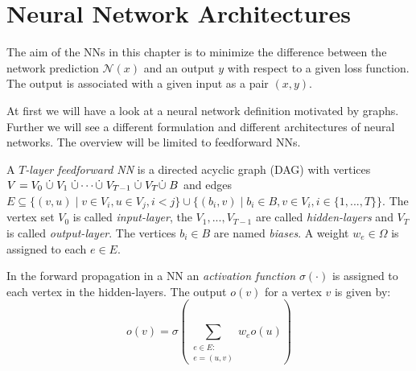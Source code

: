 \documentclass[a4paper, 12pt]{scrreprt} %
\begin{document}
\chapter{Neural Network Architectures}
\label{chap:NNA}
The aim of the \acfp{NN} in this chapter is to minimize the difference between the network prediction $\mathcal{N}(x)$ and an output $y$ with respect to a given loss function. The output is associated with a given input as a pair $(x,y)$. 

At first we will have a look at a neural network definition motivated by graphs. Further we will see a different formulation and different architectures of neural networks. The overview will be limited to feedforward \acp{NN}.

\begin{definition}
A \emph{$T$-layer feedforward \acl{NN}} is a directed acyclic graph (DAG) with vertices $V = V_0 \hspace{0.1cm}\dot \cup\hspace{0.1cm} V_1 \hspace{0.1cm}\dot \cup \cdots \dot \cup\hspace{0.1cm} V_{T-1} \hspace{0.1cm}\dot \cup \hspace{0.1cm}V_T \dot \cup\hspace{0.1cm} B$ and edges $E \subseteq \{(v, u) \mid v \in V_i, u \in V_j, i < j\} \cup \{(b_i,v) \mid b_i \in B, v \in V_{i}, i \in \{1, ..., T\}\}$. The vertex set $V_0$  is called \emph{input-layer}, the $V_1, ..., V_{T-1}$ are called \emph{hidden-layers} and $V_T$ is called \emph{output-layer}. The vertices $b_i \in B$ are named \emph{biases}. A weight $w_e \in \Omega$ is assigned to each $e \in E$.

\end{definition}

In the forward propagation in a \ac{NN} an \emph{activation function} $\sigma(\cdot)$ is assigned to each vertex in the hidden-layers. The output $o(v)$ for a vertex $v$ is given by: 
\begin{equation}
\label{actFct}
o(v) = \sigma\left(\sum\limits_{\substack{e \in E :\\ e = (u,v)}} w_e o(u)\right)
\end{equation}
\end{document}
